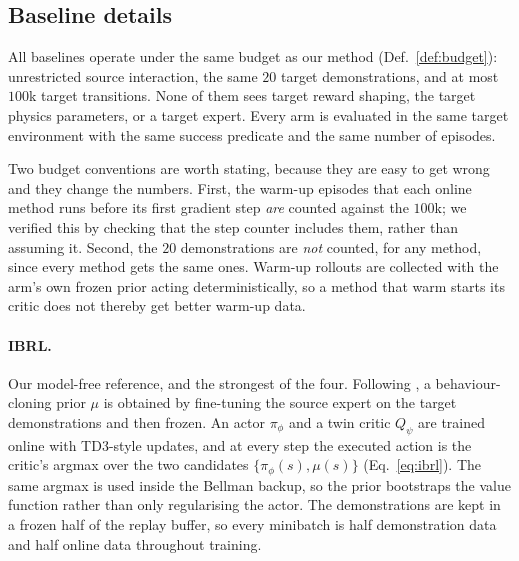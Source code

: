\subsection{Baseline details}
\label{app:baselines}

All baselines operate under the same budget as our method
(Def.~\ref{def:budget}): unrestricted source interaction, the same $20$ target
demonstrations, and at most $100$k target transitions. None of them sees target
reward shaping, the target physics parameters, or a target expert. Every arm is
evaluated in the same target environment with the same success predicate and the
same number of episodes.

Two budget conventions are worth stating, because they are easy to get wrong and
they change the numbers. First, the warm-up episodes that each online method
runs before its first gradient step \emph{are} counted against the $100$k; we
verified this by checking that the step counter includes them, rather than
assuming it. Second, the $20$ demonstrations are \emph{not} counted, for any
method, since every method gets the same ones. Warm-up rollouts are collected
with the arm's own frozen prior acting deterministically, so a method that warm
starts its critic does not thereby get better warm-up data.

\paragraph{IBRL.}
Our model-free reference, and the strongest of the four.
Following \citet{hu2023ibrl}, a behaviour-cloning prior $\mu$ is obtained by
fine-tuning the source expert on the target demonstrations and then frozen. An
actor $\pi_\phi$ and a twin critic $Q_\psi$ are trained online with TD3-style
updates, and at every step the executed action is the critic's argmax over the
two candidates $\{\pi_\phi(s), \mu(s)\}$ (Eq.~\ref{eq:ibrl}). The same argmax is
used inside the Bellman backup, so the prior bootstraps the value function
rather than only regularising the actor. The demonstrations are kept in a frozen
half of the replay buffer, so every minibatch is half demonstration data and
half online data throughout training.

